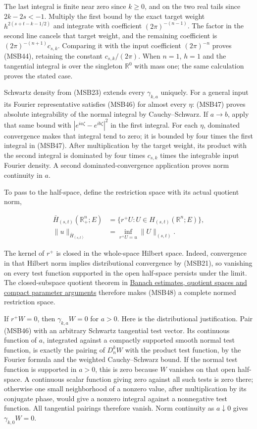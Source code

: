 \documentclass[
  11pt,
]{article}
\begin{document}
The last integral is finite near zero since \(k\geq0\), and on the two
real tails since \(2k-2s<-1\). Multiply the first bound by the exact
target weight \(h^{2(s+t-k-1/2)}\) and integrate with coefficient
\((2\pi)^{-(n-1)}\). The factor in the second line cancels that target
weight, and the remaining coefficient is \((2\pi)^{-(n+1)}c_{s,k}\).
Comparing it with the input coefficient \((2\pi)^{-n}\) proves (MSB44),
retaining the constant \(c_{s,k}/(2\pi)\). When \(n=1\), \(h=1\) and the
tangential integral is over the singleton \(\mathbb R^0\) with mass one;
the same calculation proves the stated case.

Schwartz density from (MSB23) extends every \(\gamma_{k,a}\) uniquely.
For a general input its Fourier representative satisfies (MSB46) for
almost every \(\eta\): (MSB47) proves absolute integrability of the
normal integral by Cauchy--Schwarz. If \(a\to b\), apply that same bound
with \(|e^{ia\zeta}-e^{ib\zeta}|^2\) in the first integral. For each
\(\eta\), dominated convergence makes that integral tend to zero; it is
bounded by four times the first integral in (MSB47). After
multiplication by the target weight, its product with the second
integral is dominated by four times \(c_{s,k}\) times the integrable
input Fourier density. A second dominated-convergence application proves
norm continuity in \(a\).

To pass to the half-space, define the restriction space with its actual
quotient norm,

\[
 \begin{aligned}
 \bar H_{(s,t)}(\mathbb R^n_+;E)
 &=\{r^+U:U\in H_{(s,t)}(\mathbb R^n;E)\},\\
 \|u\|_{\bar H_{(s,t)}}&=
    \inf_{r^+U=u}\|U\|_{(s,t)} .
 \end{aligned}
 \tag{MSB48}
\]

The kernel of \(r^+\) is closed in the whole-space Hilbert space.
Indeed, convergence in that Hilbert norm implies distributional
convergence by (MSB21), so vanishing on every test function supported in
the open half-space persists under the limit. The closed-subspace
quotient theorem in \href{banach-foundation-bridges.pdf}{Banach
estimates, quotient spaces and compact parameter arguments} therefore
makes (MSB48) a complete normed restriction space.

If \(r^+W=0\), then \(\gamma_{k,a}W=0\) for \(a>0\). Here is the
distributional justification. Pair (MSB46) with an arbitrary Schwartz
tangential test vector. Its continuous function of \(a\), integrated
against a compactly supported smooth normal test function, is exactly
the pairing of \(D_n^kW\) with the product test function, by the Fourier
formula and the weighted Cauchy--Schwarz bound. If the normal test
function is supported in \(a>0\), this is zero because \(W\) vanishes on
that open half-space. A continuous scalar function giving zero against
all such tests is zero there; otherwise one small neighborhood of a
nonzero value, after multiplication by its conjugate phase, would give a
nonzero integral against a nonnegative test function. All tangential
pairings therefore vanish. Norm continuity as \(a\downarrow0\) gives
\(\gamma_{k,0}W=0\).
\end{document}
